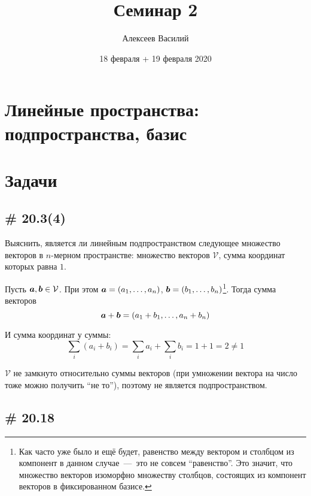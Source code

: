 \documentclass[a4paper,12pt]{article}
\author{Алексеев Василий}
\title{Семинар 2}
\date{18 февраля + 19 февраля 2020}
\begin{document}
  \maketitle
  
  \tableofcontents

  \thispagestyle{empty}
  
  \newpage
  


  \section{Линейные пространства: подпространства, базис}
  
  \section{Задачи}
  
  
  \subsection{\# 20.3(4)}
  
  Выяснить, является ли линейным подпространством следующее множество векторов в $n$-мерном пространстве:
  множество векторов $\mathcal V$, сумма координат которых равна $1$.
  
  \begin{solution}
    Пусть $\boldsymbol a, \boldsymbol b \in \mathcal V$.
    При этом $\bds a \hm= (a_1, \ldots, a_n)$, $\bds b \hm= (b_1, \ldots, b_n)$\footnote{Как часто уже было и ещё будет, равенство между вектором и столбцом из компонент в данном случае~---~это не совсем ``равенство''. Это значит, что множество векторов изоморфно множеству столбцов, состоящих из компонент векторов в фиксированном базисе.}.
    Тогда сумма векторов
    \[
      \boldsymbol a + \boldsymbol b = (a_1 + b_1, \ldots, a_n + b_n)
    \]
    
    И сумма координат у суммы:
    \[
      \sum_i (a_i + b_i) = \sum_i a_i + \sum_i b_i = 1 + 1 = 2 \not= 1
    \]
    
    $\mathcal V$ не замкнуто относительно суммы векторов (при умножении вектора на число тоже можно получить ``не то''), поэтому не является подпространством.
  \end{solution}
  
  
  \subsection{\# 20.18}
  
\end{document}
